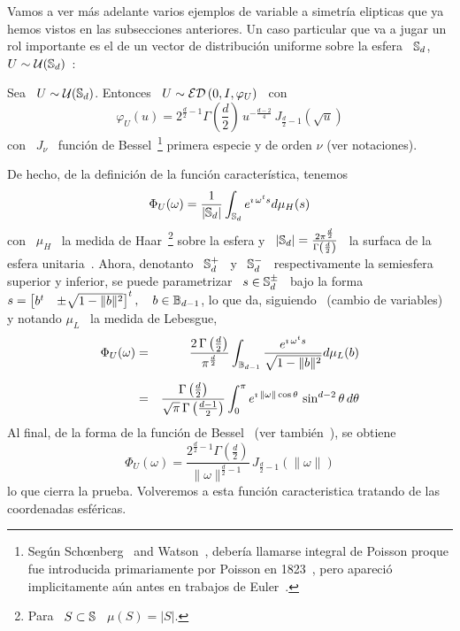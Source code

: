 Vamos a  ver m\'as adelante varios  ejemplos de variable  a simetr\'ia elipticas
que ya hemos vistos en las subsecciones anteriores.  Un caso particular que va a
jugar un rol  importante es el de un vector de  distribuci\'on uniforme sobre la
esfera \ $\mathbb{S}_d$, \ $U \sim \mathcal{U}(\mathbb{S}_d)$~\cite{FanKot90}:
%
\begin{ejemplo}\label{Ej:MP:GeneCaracUniformeEsfera}
%
  Sea \  $U \sim \mathcal{U}(\mathbb{S}_d)$. Entonces  \ $U \sim  \mathcal{ED}\left( 0 , I  , \varphi_U
  \right)$ \ con
  \[
  \varphi_U(u)   =  2^{\frac{d}{2}-1}   \Gamma\left(   \frac{d}{2}  \right)   \,
  u^{-\frac{d-2}{4}} \, J_{\frac{d}{2}-1}\left( \sqrt{u} \right)
  \]
  con \ $J_\nu$ \ funci\'on de Bessel~\footnote{Seg\'un Sch{\oe}nberg~\cite[Nota
    de  pie~9]{Sch38} and Watson~\cite[p.~24,  nota de  pie~*]{Wat22}, deber\'ia
    llamarse  integral  de  Poisson  proque fue  introducida  primariamente  por
    Poisson en 1823~\cite{Poi23}, pero  apareci\'o implicitamente a\'un antes en
    trabajos  de Euler~\cite[Cap.~X, \S~1036]{Eul1769}.}   primera especie  y de
  orden $\nu$ (ver notaciones).
  
  De hecho, de la definici\'on de la funci\'on caracter\'istica, tenemos
  \[
  \Phi_U(\omega) =  \frac{1}{|\mathbb{S}_d|} \int_{\mathbb{S}_d} e^{\imath  \, \omega^t s}
  d\mu_H(s)
  \]
  con \ $\mu_H$ \ la medida de Haar~\footnote{Para \ $S \subset \mathbb{S}$ \ $\mu(S)
    =    |S|$.}     sobre    la    esfera    y   \    $|\mathbb{S}_d|    =    \frac{2
    \pi^{\frac{d}{2}}}{\Gamma\left(  \frac{d}{2} \right)}$  \ la  surfaca  de la
  esfera  unitaria~\cite{GraRyz15}.   Ahora,  denotanto  \  $\mathbb{S}_d^+$  \  y  \
  $\mathbb{S}_d^-$  \ respectivamente  la semiesfera  superior y  inferior,  se puede
  parametrizar \  $s \in \mathbb{S}_d^{\pm}$ \  bajo la forma \  $s = \begin{bmatrix}
    b^t & \pm \sqrt{1-\|b\|^2} \end{bmatrix}^t, \quad b \in \mathbb{B}_{d-1}$, lo que
  da,  siguiendo~\cite[ec.~4.644]{GraRyz15}  (cambio  de  variables)  y  notando
  $\mu_L$ \ la medida de Lebesgue,
  \begin{eqnarray*}
  \Phi_U(\omega) & = & \frac{2 \, \Gamma\left( \frac{d}{2}
  \right)}{\pi^{\frac{d}{2}}} \int_{\mathbb{B}_{d-1}} \frac{e^{\imath \, \omega^t
  s}}{\sqrt{1-\|b\|^2}} d\mu_L(b)\\[2mm]
  & = & \frac{\Gamma\left( \frac{d}{2} \right)}{\sqrt{\pi} \, \Gamma\left(
  \frac{d-1}{2} \right)} \int_0^{\pi} e^{\imath \, \| \omega \| \cos\theta} \,
  \sin^{d-2}\theta \, d\theta
  \end{eqnarray*}
  Al final,  de la forma de la  funci\'on de Bessel~\cite[Ec.~8.411-7]{GraRyz15}
  (ver tambi\'en~\cite{AbrSte70, Wat22, GraMat95}), se obtiene
  \[
  \Phi_U(\omega) =  \frac{2^{\frac{d}{2}-1} \Gamma\left( \frac{d}{2} \right)}{\|
    \omega \|^{\frac{d}{2}-1}} \, J_{\frac{d}{2}-1}\left( \|\omega\| \right)
  \]
  lo que cierra  la prueba. Volveremos a esta  funci\'on caracteristica tratando
  de las coordenadas esf\'ericas.
\end{ejemplo}

